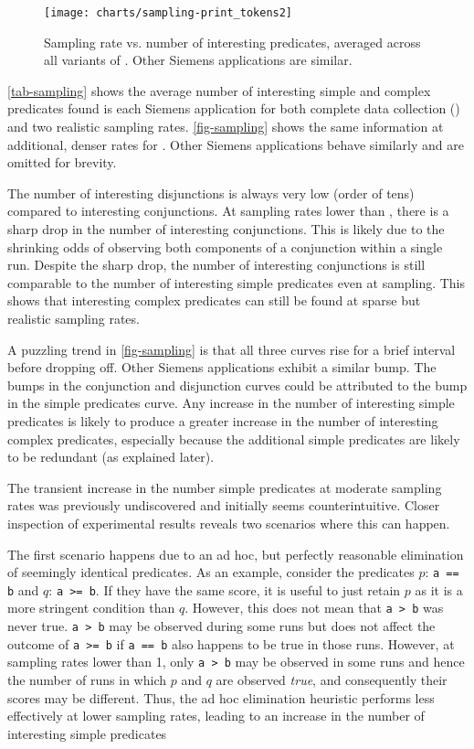 \begin{figure}[tb]
  \centering
  \texttt{[image: charts/sampling-print\_tokens2]}
  \caption{Sampling rate vs. number of interesting predicates,
    averaged across all variants of .  Other
    Siemens applications are similar.}
  \label{fig-sampling}
\end{figure}

\autoref{tab-sampling} shows the average number of interesting simple
and complex predicates found is each Siemens application for both
complete data collection () and two realistic sampling
rates.  \autoref{fig-sampling} shows the same information at
additional, denser rates for .  Other Siemens
applications behave similarly and are omitted for brevity.

The number of interesting disjunctions is always very low (order of
tens) compared to interesting conjunctions.  At sampling rates lower
than , there is a sharp drop in the number of
interesting conjunctions.  This is likely due to the shrinking odds of
observing both components of a conjunction within a single run.
Despite the sharp drop, the number of interesting conjunctions is
still comparable to the number of interesting simple predicates even
at  sampling.  This shows that interesting complex
predicates can still be found at sparse but realistic sampling rates.

A puzzling trend in \autoref{fig-sampling} is that all three curves
rise for a brief interval before dropping off.  Other Siemens
applications exhibit a similar bump.  The bumps in the conjunction and
disjunction curves could be attributed to the bump in the simple
predicates curve.  Any increase in the number of interesting simple
predicates is likely to produce a greater increase in the number of
interesting complex predicates, especially because the additional
simple predicates are likely to be redundant (as explained later).

The transient increase in the number simple predicates at moderate
sampling rates was previously undiscovered and initially seems
counterintuitive.  Closer inspection of experimental results reveals
two scenarios where this can happen.

The first scenario happens due to an ad hoc, but perfectly reasonable
elimination of seemingly identical predicates.  As an example, consider the
predicates $p$: \texttt{a == b} and $q$: \texttt{a >= b}.  If they have the
same score, it is useful to just retain $p$ as it is a more stringent
condition than $q$.  However, this does not mean
that \texttt{a > b} was never true.  \texttt{a > b} may be observed  during 
some runs but does not affect the outcome of \texttt{a >= b} if \texttt{a == b}
also happens to be true in those runs.  However, at sampling rates lower than
1, only \texttt{a > b} may be observed in some runs and hence the number of
runs in which $p$ and $q$ are observed \emph{true}, and consequently their
scores may be different.  Thus, the ad hoc elimination heuristic performs 
less effectively at lower sampling rates, leading to an increase in the 
number of interesting simple predicates

